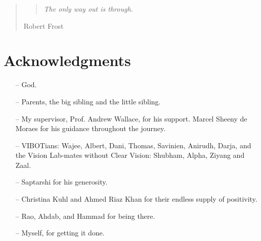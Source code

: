 \begin{quote}
\vspace*{\fill}
\begin{center}
\begin{quote}
\centering \it The only way out is through.
\end{quote}
\end{center}
\hfill{\small Robert Frost}
\vspace*{\fill}

\end{quote}


\doublespacing

\setcounter{page}{1} \pagestyle{plain}


\tableofcontents

\listoffigures
\listoftables

\chapter*{Acknowledgments}
         {\protect{}}
\begin{itemize}
\item[--] God. 
\item[--] Parents, the big sibling and the little sibling.
\item[--] My supervisor, Prof. Andrew Wallace, for his support. Marcel Sheeny de Moraes for his guidance throughout the journey.
\item[--] VIBOTians: Wajee, Albert, Dani, Thomas, Savinien, Anirudh, Darja, and the Vision Lab-mates without Clear Vision: Shubham, Alpha, Ziyang and Zaal. 
\item[--] Saptarshi for his generosity.
\item[--] Christina Kuhl and Ahmed Riaz Khan for their endless supply of positivity. 
\item [--]Rao, Ahdab, and Hammad for being there. 
\item[--] Myself, for getting it done.
\end{itemize}

\pagestyle{fancy}